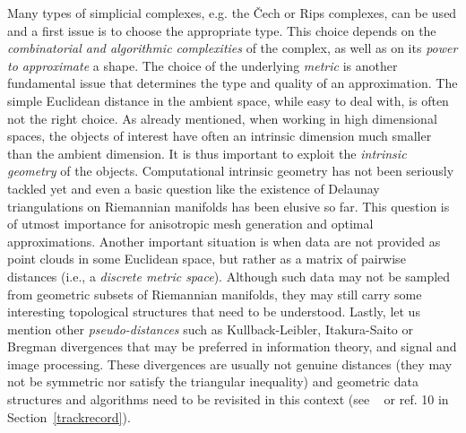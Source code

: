  Many types of simplicial complexes, e.g. the \v{C}ech  or Rips complexes, can be used and a first issue is to choose the appropriate type. This choice depends on the {\em combinatorial and algorithmic complexities} of the complex, as well as on its {\em power to approximate} a shape.
 The choice of the underlying {\em metric} %
 is another  fundamental issue 
that determines the type and quality of an approximation.
 The simple Euclidean distance in the ambient space, while easy to deal with, is often not the right choice.  As already mentioned, when working in high dimensional spaces, the objects of interest have often an intrinsic dimension much smaller than the ambient dimension. It is thus important to exploit the {\em intrinsic geometry} of the objects. Computational intrinsic geometry has not been seriously tackled yet and even a basic question like the existence of  Delaunay triangulations on Riemannian manifolds has been elusive so far.  This question is of utmost importance for anisotropic mesh generation and optimal approximations. Another important situation is when data are not provided as  point clouds in some Euclidean space, but rather as a matrix of pairwise distances (i.e., a {\em discrete metric space}). Although such data may not be sampled from geometric subsets of Riemannian manifolds, they may still carry some interesting topological structures that need to be understood. 
Lastly, let us mention other {\em pseudo-distances} such as
Kullback-Leibler, Itakura-Saito or Bregman divergences that may be
preferred in information theory, and signal and image processing.
 These divergences are usually not genuine distances (they may not be symmetric nor satisfy the triangular inequality) and  geometric data structures and algorithms need to be revisited in this context (see ~\cite{geometrica-6154a} or ref. 10 in Section~\ref{trackrecord}).%


\vspace{-3.1mm}


